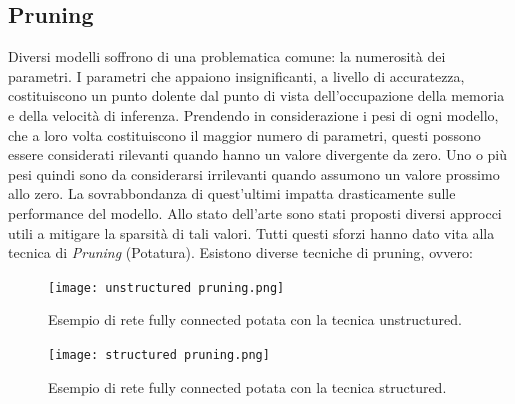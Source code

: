 \subsection{Pruning}
Diversi modelli soffrono di una problematica comune: la numerosità 
dei parametri. I parametri che appaiono insignificanti, a livello di accuratezza, 
costituiscono un punto dolente dal punto di vista dell'occupazione della memoria e della 
velocità di inferenza. Prendendo in considerazione i pesi di 
ogni modello, che a loro volta costituiscono il maggior numero di parametri, 
questi possono essere considerati rilevanti quando hanno un valore divergente 
da zero. Uno o più pesi quindi sono da considerarsi irrilevanti quando 
assumono un valore prossimo allo zero. La sovrabbondanza di quest'ultimi 
impatta drasticamente sulle performance del modello. Allo stato dell'arte 
sono stati proposti diversi approcci \cite{salama2019pruning} utili a mitigare la sparsità di tali 
valori. Tutti questi sforzi hanno dato vita alla tecnica di \emph{Pruning} (Potatura).  
Esistono diverse tecniche di pruning, ovvero:
\begin{figure}
    \centering
    \texttt{[image: unstructured pruning.png]}
    \centering
    \caption{Esempio di rete fully connected potata con la tecnica unstructured.}
    \label{unstruct-prun}
\end{figure}

\begin{figure}
    \centering
    \texttt{[image: structured pruning.png]}
    \centering
    \caption{Esempio di rete fully connected potata con la tecnica structured.}
    \label{struct-prun}
\end{figure}

